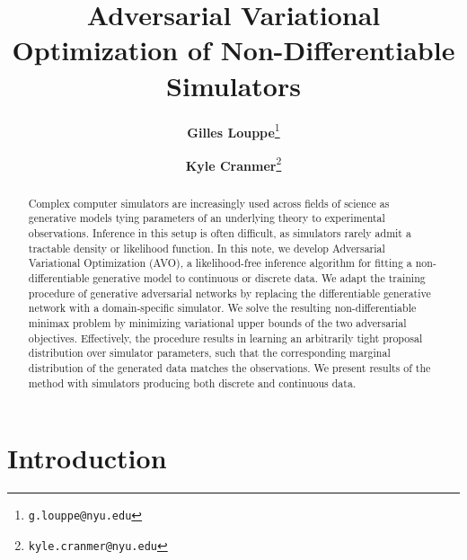 \documentclass[twocolumn,superscriptaddress,aps]{revtex4-1}
\theoremstyle{plain}
\begin{document}

\title{\Large{Adversarial Variational Optimization of Non-Differentiable Simulators}}
\vspace{1cm}
\author{\small{\bf Gilles Louppe}\thanks{\texttt{g.louppe@nyu.edu}}}
\author{\small{\bf Kyle Cranmer}\thanks{\texttt{kyle.cranmer@nyu.edu}}}

\begin{abstract}
Complex computer simulators are increasingly used across fields of science as
generative models tying parameters of an underlying theory to
experimental observations. Inference in this setup is often
difficult, as simulators rarely admit a tractable density or likelihood
function. In this note, we develop Adversarial Variational Optimization (AVO), a likelihood-free
inference algorithm for fitting a non-differentiable generative model to
continuous or discrete  data. We adapt the training procedure of generative
adversarial networks by replacing the differentiable generative network with a
domain-specific simulator. We solve the resulting non-differentiable
minimax problem by minimizing variational upper bounds of the two adversarial objectives.
Effectively, the procedure results in learning an arbitrarily tight
proposal distribution over simulator parameters, such that the corresponding
marginal distribution of the generated data matches the observations.
We present results of the method with simulators producing both discrete and continuous data.

\end{abstract}

\maketitle


\section{Introduction}

\end{document}
